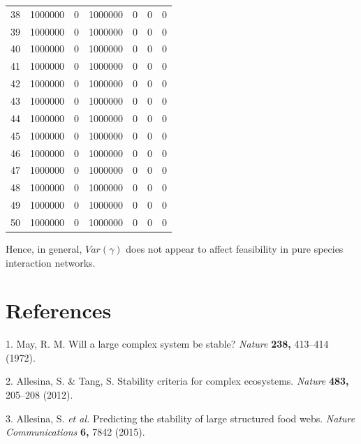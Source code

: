 \documentclass[]{article}
\begin{document}
\begin{longtable}[]{@{}rrrrrrr@{}}
38 & 1000000 & 0 & 1000000 & 0 & 0 & 0\tabularnewline
39 & 1000000 & 0 & 1000000 & 0 & 0 & 0\tabularnewline
40 & 1000000 & 0 & 1000000 & 0 & 0 & 0\tabularnewline
41 & 1000000 & 0 & 1000000 & 0 & 0 & 0\tabularnewline
42 & 1000000 & 0 & 1000000 & 0 & 0 & 0\tabularnewline
43 & 1000000 & 0 & 1000000 & 0 & 0 & 0\tabularnewline
44 & 1000000 & 0 & 1000000 & 0 & 0 & 0\tabularnewline
45 & 1000000 & 0 & 1000000 & 0 & 0 & 0\tabularnewline
46 & 1000000 & 0 & 1000000 & 0 & 0 & 0\tabularnewline
47 & 1000000 & 0 & 1000000 & 0 & 0 & 0\tabularnewline
48 & 1000000 & 0 & 1000000 & 0 & 0 & 0\tabularnewline
49 & 1000000 & 0 & 1000000 & 0 & 0 & 0\tabularnewline
50 & 1000000 & 0 & 1000000 & 0 & 0 & 0\tabularnewline
\bottomrule
\end{longtable}

Hence, in general, \(Var(\gamma)\) does not appear to affect feasibility
in pure species interaction networks.

\section*{References}\label{references}

\hypertarget{refs}{}
\hypertarget{ref-May1972}{}
1. May, R. M. Will a large complex system be stable? \emph{Nature}
\textbf{238,} 413--414 (1972).

\hypertarget{ref-Allesina2012}{}
2. Allesina, S. \& Tang, S. Stability criteria for complex ecosystems.
\emph{Nature} \textbf{483,} 205--208 (2012).

\hypertarget{ref-Allesina2015}{}
3. Allesina, S. \emph{et al.} Predicting the stability of large
structured food webs. \emph{Nature Communications} \textbf{6,} 7842
(2015).
\end{document}
